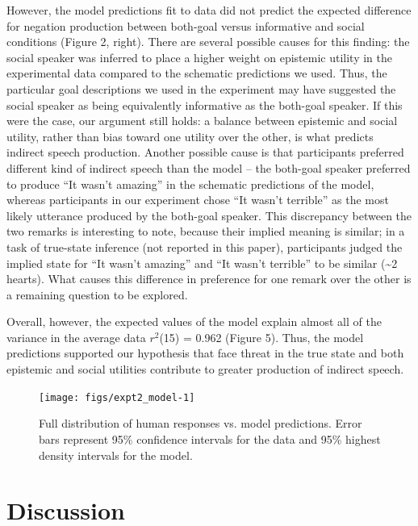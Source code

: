 \documentclass[10pt, letterpaper]{article}
\newenvironment{CodeChunk}{}{}
\begin{document}
However, the model predictions fit to data did not predict the expected
difference for negation production between both-goal versus informative
and social conditions (Figure 2, right). There are several possible
causes for this finding: the social speaker was inferred to place a
higher weight on epistemic utility in the experimental data compared to
the schematic predictions we used. Thus, the particular goal
descriptions we used in the experiment may have suggested the social
speaker as being equivalently informative as the both-goal speaker. If
this were the case, our argument still holds: a balance between
epistemic and social utility, rather than bias toward one utility over
the other, is what predicts indirect speech production. Another possible
cause is that participants preferred different kind of indirect speech
than the model -- the both-goal speaker preferred to produce ``It wasn't
amazing'' in the schematic predictions of the model, whereas
participants in our experiment chose ``It wasn't terrible'' as the most
likely utterance produced by the both-goal speaker. This discrepancy
between the two remarks is interesting to note, because their implied
meaning is similar; in a task of true-state inference (not reported in
this paper), participants judged the implied state for ``It wasn't
amazing'' and ``It wasn't terrible'' to be similar (\textasciitilde{}2
hearts). What causes this difference in preference for one remark over
the other is a remaining question to be explored.

Overall, however, the expected values of the model explain almost all of
the variance in the average data \(r^2\)(15) = 0.962 (Figure 5). Thus,
the model predictions supported our hypothesis that face threat in the
true state and both epistemic and social utilities contribute to greater
production of indirect speech.

\begin{CodeChunk}
\begin{figure}[h]

{\centering \texttt{[image: figs/expt2\_model-1]} 

}

\caption[Full distribution of human responses vs]{Full distribution of human responses vs. model predictions. Error bars represent 95\% confidence intervals for the data and 95\% highest density intervals for the model.}\label{fig:expt2_model}
\end{figure}
\end{CodeChunk}

\section{Discussion}\label{discussion}
\end{document}
